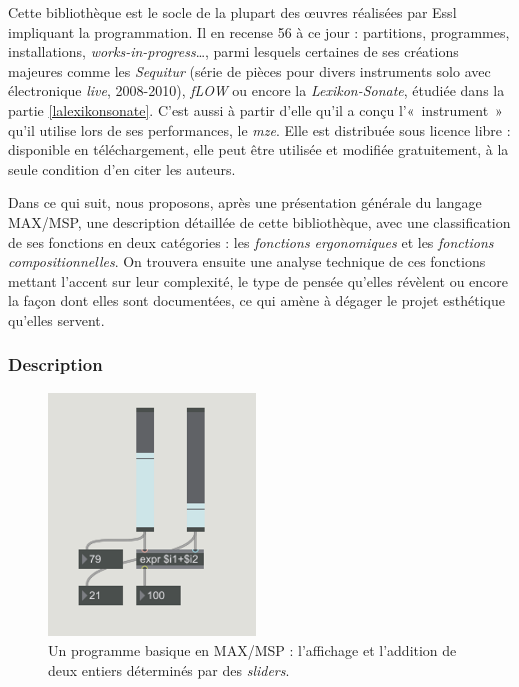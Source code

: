 \documentclass[a4paper,12pt]{article}
\newcommand{\guill}[1]{«~#1~»}
\newcommand{\maze}[0]{\emph{m\symbol{64}ze\textdegree2}}
\begin{document}
Cette bibliothèque est le socle de la plupart des œuvres réalisées par Essl impliquant la programmation. Il en recense 56 à ce jour : partitions, programmes, installations, \emph{works-in-progress}\dots, parmi lesquels certaines de ses créations majeures comme les \emph{Sequitur} (série de pièces pour divers instruments solo avec électronique \emph{live}, 2008-2010), \emph{fLOW} ou encore la \emph{Lexikon-Sonate}, étudiée dans la partie \ref{lalexikonsonate}. C'est aussi à partir d'elle qu'il a conçu l'\guill{instrument} qu'il utilise lors de ses performances, le \maze. Elle est distribuée sous licence libre : disponible en téléchargement, elle peut être utilisée et modifiée gratuitement, à la seule condition d'en citer les auteurs.

Dans ce qui suit, nous proposons, après une présentation générale du langage MAX/MSP, une description détaillée de cette bibliothèque, avec une classification de ses fonctions en deux catégories : les \emph{fonctions ergonomiques} et les \emph{fonctions compositionnelles}. On trouvera ensuite une analyse technique de ces fonctions mettant l'accent sur leur complexité, le type de pensée qu'elles révèlent ou encore la façon dont elles sont documentées, ce qui amène à dégager le projet esthétique qu'elles servent.

\subsubsection{Description}

\begin{figure}[!h]
\centering
\includegraphics[width=5.5cm]{images/MAXbase.png}
\caption{\footnotesize Un programme basique en MAX/MSP : l'affichage et l'addition de deux entiers déterminés par des \emph{sliders}.}
\label{maxmsp}
\end{figure}
\end{document}
